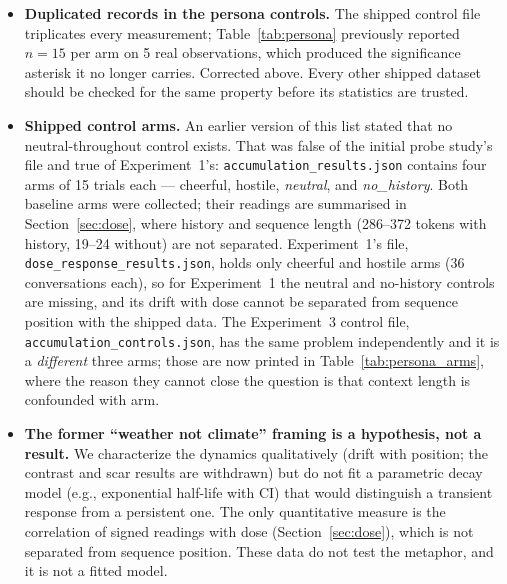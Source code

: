 \documentclass[11pt,a4paper]{article}
\begin{document}
\begin{itemize}[nosep]
    \item \textbf{Duplicated records in the persona controls.} The shipped
          control file triplicates every measurement; Table~\ref{tab:persona}
          previously reported $n{=}15$ per arm on 5 real observations, which
          produced the significance asterisk it no longer carries. Corrected
          above. Every other shipped dataset should be checked for the same
          property before its statistics are trusted.
    \item \textbf{Shipped control arms.} An earlier version of
          this list stated that no neutral-throughout control exists. That was
          false of the initial probe study's file and true of Experiment~1's:
          \texttt{accumulation\_results.json} contains
          four arms of 15 trials each --- cheerful, hostile, \emph{neutral}, and
          \emph{no\_history}. Both baseline arms were collected; their readings are summarised
          in Section~\ref{sec:dose}, where history and sequence length
          (286--372 tokens with history, 19--24 without) are not separated.
          Experiment~1's file,
          \texttt{dose\_response\_results.json}, holds only cheerful and
          hostile arms (36 conversations each), so for Experiment~1 the
          neutral and no-history controls are missing, and its drift with
          dose cannot be separated from sequence position with the shipped
          data. The Experiment~3
          control file, \texttt{accumulation\_controls.json}, has the same
          problem independently and it is a \emph{different} three arms; those
          are now printed in Table~\ref{tab:persona_arms}, where the reason
          they cannot close the question is that context length is confounded
          with arm.
    \item \textbf{The former ``weather not climate'' framing is a hypothesis,
          not a result.} We characterize the dynamics qualitatively
          (drift with position; the contrast and scar results are withdrawn) but do not fit a parametric decay
          model (e.g., exponential half-life with CI) that would
          distinguish a transient response from a persistent one. The only quantitative measure is the correlation of signed
          readings with dose (Section~\ref{sec:dose}), which is not
          separated from sequence position. These data do not test the metaphor, and it is not a fitted
          model.
\end{itemize}
\end{document}
